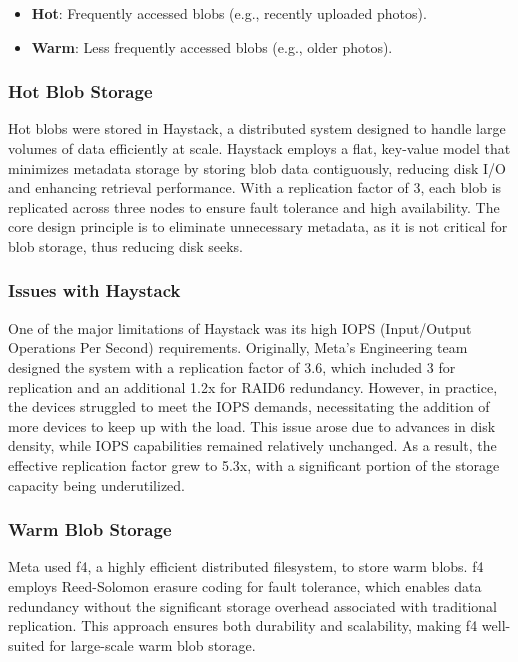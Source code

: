 \begin{itemize}\label{blob_categories}
    \item \textbf{Hot}: Frequently accessed blobs (e.g., recently uploaded photos).
    \item \textbf{Warm}: Less frequently accessed blobs (e.g., older photos).
\end{itemize}

\subsubsection*{Hot Blob Storage}\label{sec:hot_blob_storage}

Hot blobs were stored in Haystack\cite{haystack}, a distributed system designed to handle large volumes of data efficiently at scale. Haystack employs a flat, key-value model that minimizes metadata storage by storing blob data contiguously, reducing disk I/O and enhancing retrieval performance. With a replication factor of 3, each blob is replicated across three nodes to ensure fault tolerance and high availability. The core design principle is to eliminate unnecessary metadata, as it is not critical for blob storage, thus reducing disk seeks.

\subsubsection*{Issues with Haystack}\label{sec:haystack_issues}
One of the major limitations of Haystack was its high IOPS (Input/Output Operations Per Second) requirements. Originally, Meta's Engineering team designed the system with a replication factor of 3.6, which included 3 for replication and an additional 1.2x for RAID6 redundancy. However, in practice, the devices struggled to meet the IOPS demands, necessitating the addition of more devices to keep up with the load. This issue arose due to advances in disk density, while IOPS capabilities remained relatively unchanged. As a result, the effective replication factor grew to 5.3x, with a significant portion of the storage capacity being underutilized.

\subsubsection*{Warm Blob Storage}\label{sec:warm_blob_storage}
Meta used f4\cite{f4}, a highly efficient distributed filesystem, to store warm blobs. f4 employs Reed-Solomon erasure coding\cite{ReedSolomon1960} for fault tolerance, which enables data redundancy without the significant storage overhead associated with traditional replication. This approach ensures both durability and scalability, making f4 well-suited for large-scale warm blob storage.

